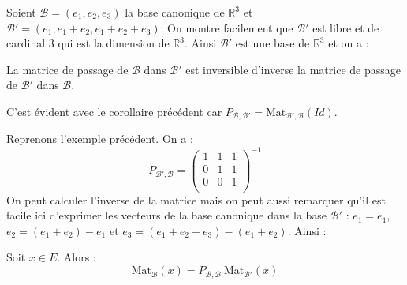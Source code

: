 \documentclass[a4paper,10pt]{report}
\begin{document}
\begin{ex} Soient $\mathcal{B}=(e_1,e_2,e_3)$ la base canonique de $\mathbb{R}^3$ et $\mathcal{B}'=(e_1,e_1+e_2, e_1+e_2+e_3)$. On montre facilement que $\mathcal{B}'$ est libre et de cardinal $3$ qui est la dimension de $\mathbb{R}^3$. Ainsi $\mathcal{B}'$ est une base de $\mathbb{R}^3$ et on a :

\vspace{2.7cm}
\end{ex}

\begin{prop} La matrice de passage de $\mathcal{B}$ dans $\mathcal{B}'$ est inversible d'inverse la matrice de passage de $\mathcal{B}'$ dans $\mathcal{B}$.
\end{prop}

\begin{preuve} C'est évident avec le corollaire précédent car $P_{\mathcal{B}, \mathcal{B}'} = \textrm{Mat}_{\mathcal{B}', \mathcal{B}}(Id)$.
\end{preuve}

\medskip

\begin{ex} Reprenons l'exemple précédent. On a :
$$ P_{\mathcal{B}', \mathcal{B}} = \begin{pmatrix}
1 & 1 & 1 \\
0 & 1 & 1 \\
0 & 0& 1 \\
\end{pmatrix}^{-1}$$
On peut calculer l'inverse de la matrice mais on peut aussi remarquer qu'il est facile ici d'exprimer les vecteurs de la base canonique dans la base $\mathcal{B}'$ : $e_1=e_1$, $e_2 =(e_1+e_2)-e_1$ et $e_3 = (e_1+e_2+e_3)-(e_1+e_2)$. Ainsi :

\vspace{3cm}
\end{ex}

\begin{prop} Soit $x \in E$. Alors :
$$ \textrm{Mat}_{\mathcal{B}}(x) = P_{\mathcal{B}, \mathcal{B}'} \textrm{Mat}_{\mathcal{B}'}(x)$$
\end{prop}
\end{document}
